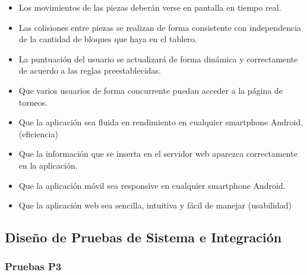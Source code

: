 \documentclass{article}
\begin{document}
\begin{itemize}
    \item Los movimientos de las piezas deberán verse en pantalla en tiempo real.
    
    \item Las colisiones entre piezas se realizan de forma consistente con independencia de la cantidad de bloques que haya en el tablero.
    
    \item La puntuación del usuario se actualizará de forma dinámica y correctamente de acuerdo a las reglas preestablecidas.
    
    \item Que varios usuarios de forma concurrente puedan acceder a la página de torneos.

    \item Que la aplicación sea fluida en rendimiento en cualquier smartphone Android. (eficiencia)
    
    \item Que la información que se inserta en el servidor web aparezca correctamente en la aplicación.
    
    \item Que la aplicación móvil sea responsive en cualquier smartphone Android.
    
    \item Que la aplicación web sea sencilla, intuitiva y fácil de manejar (usabilidad)
    
\end{itemize}

\subsection{Diseño de Pruebas de Sistema e Integración}

\subsubsection{Pruebas P3}
\end{document}
